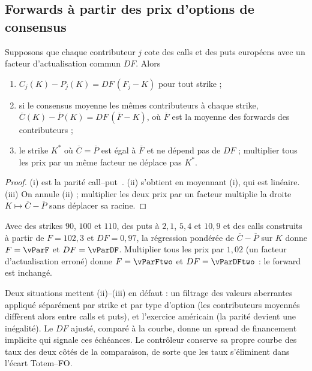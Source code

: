 \subsection{Forwards à partir des prix d'options de consensus}
\begin{lemma}\label{lem-parity}
Supposons que chaque contributeur $j$ cote des calls et des puts européens avec un facteur d'actualisation commun $DF$.
Alors
\begin{enumerate}[label=(\roman*)]
\item $C_j(K)-P_j(K)=DF\,(F_j-K)$ pour tout strike ;
\item si le consensus moyenne les mêmes contributeurs à chaque strike,
$\overline{C}(K)-\overline{P}(K)=DF\,(\overline{F}-K)$, où $\overline{F}$ est la moyenne des forwards des contributeurs ;
\item le strike $K^\ast$ où $\overline{C}=\overline{P}$ est égal à $\overline{F}$ et ne dépend pas de $DF$ ;
multiplier tous les prix par un même facteur ne déplace pas $K^\ast$.
\end{enumerate}
\end{lemma}
\begin{proof}
(i) est la parité call--put~\cite{hull}. (ii) s'obtient en moyennant (i), qui est linéaire. (iii) On annule (ii) ;
multiplier les deux prix par un facteur multiplie la droite $K\mapsto\overline{C}-\overline{P}$ sans déplacer sa racine.
\end{proof}

\begin{example}\label{ex-parity}
Avec des strikes $90$, $100$ et $110$, des puts à $2{,}1$, $5{,}4$ et $10{,}9$ et des calls construits à partir de
$F=102{,}3$ et $DF=0{,}97$, la régression pondérée de $\overline{C}-\overline{P}$ sur $K$ donne $F=\vParF$ et
$DF=\vParDF$. Multiplier tous les prix par $1{,}02$ (un facteur d'actualisation erroné) donne $F=\vParFtwo$ et
$DF=\vParDFtwo$ : le forward est inchangé.
\end{example}

\begin{remark}
Deux situations mettent (ii)--(iii) en défaut : un filtrage des valeurs aberrantes appliqué séparément par strike et
par type d'option (les contributeurs moyennés diffèrent alors entre calls et puts), et l'exercice américain (la parité
devient une inégalité). Le $DF$ ajusté, comparé à la courbe, donne un spread de financement implicite qui signale ces
échéances. Le contrôleur conserve sa propre courbe des taux des deux côtés de la comparaison, de sorte que les taux
s'éliminent dans l'écart Totem--FO.
\end{remark}

